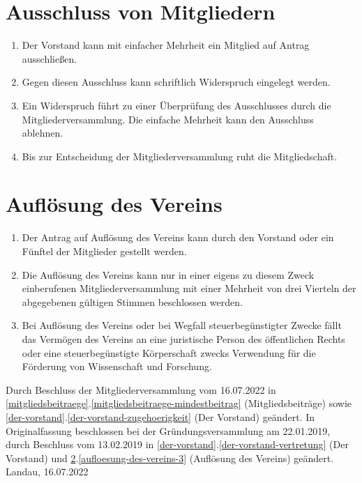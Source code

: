 \documentclass[a4paper, 12pt]{scrartcl}
\begin{document}
\section{Ausschluss von Mitgliedern}
\begin{enumerate}
	\item Der Vorstand kann mit einfacher Mehrheit ein Mitglied auf Antrag ausschließen.
	\item Gegen diesen Ausschluss kann schriftlich Widerspruch eingelegt werden.
	\item Ein Widerspruch führt zu einer Überprüfung des Ausschlusses durch die Mitgliederversammlung. Die einfache Mehrheit kann den Ausschluss ablehnen.
	\item Bis zur Entscheidung der Mitgliederversammlung ruht die Mitgliedschaft.
\end{enumerate}

\section{Auflösung des Vereins}
\label{aufloesung-des-vereins}
\begin{enumerate}
	\item Der Antrag auf Auflösung des Vereins kann durch den Vorstand oder ein Fünftel der Mitglieder gestellt werden.
	\item Die Auflösung des Vereins kann nur in einer eigens zu diesem Zweck einberufenen Mitgliederversammlung mit einer Mehrheit von drei Vierteln der abgegebenen gültigen Stimmen beschlossen werden.
	\item \label{aufloesung-des-vereins-3} Bei Auflösung des Vereins oder bei Wegfall steuerbegünstigter Zwecke fällt das Vermögen des Vereins an eine juristische Person des öffentlichen Rechts oder eine steuerbegünstigte Körperschaft zwecks Verwendung für die Förderung von Wissenschaft und Forschung.
\end{enumerate}

\vspace{2.5cm}

\noindent Durch Beschluss der Mitgliederversammlung vom 16.07.2022 in \ref{mitgliedsbeitraege}.\ref{mitgliedsbeitraege-mindestbeitrag} (Mitgliedsbeiträge) sowie \ref{der-vorstand}.\ref{der-vorstand-zugehoerigkeit} (Der Vorstand) geändert. In Originalfassung beschlossen bei der Gründungsversammlung am 22.01.2019, durch Beschluss vom 13.02.2019 in \ref{der-vorstand}.\ref{der-vorstand-vertretung} (Der Vorstand) und \ref{aufloesung-des-vereins}.\ref{aufloesung-des-vereins-3} (Auflösung des Vereins) geändert.\\[0.5cm]

\noindent Landau, 16.07.2022
\end{document}
